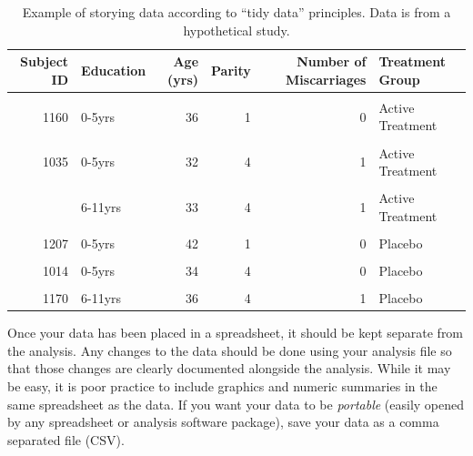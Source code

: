 \documentclass[
  letterpaper,
  DIV=11,
  numbers=noendperiod]{scrreprt}
\theoremstyle{definition}
\theoremstyle{definition}
\theoremstyle{remark}
\begin{document}
\hypertarget{tbl-statistical-process-tidy-data}{}
\begin{table}
\caption{\label{tbl-statistical-process-tidy-data}Example of storying data according to ``tidy data'' principles. Data is
from a hypothetical study. }\tabularnewline

\centering
\begin{tabular}[t]{rlrrrl}
\toprule
Subject ID & Education & Age (yrs) & Parity & Number of Miscarriages & Treatment Group\\
\midrule
\cellcolor{gray!6}{1089} & \cellcolor{gray!6}{0-5yrs} & \cellcolor{gray!6}{28} & \cellcolor{gray!6}{6} & \cellcolor{gray!6}{0} & \cellcolor{gray!6}{Active Treatment}\\
1160 & 0-5yrs & 36 & 1 & 0 & Active Treatment\\
\cellcolor{gray!6}{1025} & \cellcolor{gray!6}{0-5yrs} & \cellcolor{gray!6}{34} & \cellcolor{gray!6}{6} & \cellcolor{gray!6}{0} & \cellcolor{gray!6}{Active Treatment}\\
1035 & 0-5yrs & 32 & 4 & 1 & Active Treatment\\
\cellcolor{gray!6}{1112} & \cellcolor{gray!6}{6-11yrs} & \cellcolor{gray!6}{32} & \cellcolor{gray!6}{3} & \cellcolor{gray!6}{0} & \cellcolor{gray!6}{Active Treatment}\\
\addlinespace
1030 & 6-11yrs & 33 & 4 & 1 & Active Treatment\\
\cellcolor{gray!6}{1159} & \cellcolor{gray!6}{0-5yrs} & \cellcolor{gray!6}{26} & \cellcolor{gray!6}{6} & \cellcolor{gray!6}{2} & \cellcolor{gray!6}{Placebo}\\
1207 & 0-5yrs & 42 & 1 & 0 & Placebo\\
\cellcolor{gray!6}{1179} & \cellcolor{gray!6}{0-5yrs} & \cellcolor{gray!6}{39} & \cellcolor{gray!6}{6} & \cellcolor{gray!6}{0} & \cellcolor{gray!6}{Placebo}\\
1014 & 0-5yrs & 34 & 4 & 0 & Placebo\\
\addlinespace
\cellcolor{gray!6}{1195} & \cellcolor{gray!6}{6-11yrs} & \cellcolor{gray!6}{35} & \cellcolor{gray!6}{3} & \cellcolor{gray!6}{1} & \cellcolor{gray!6}{Placebo}\\
1170 & 6-11yrs & 36 & 4 & 1 & Placebo\\
\bottomrule
\end{tabular}
\end{table}

Once your data has been placed in a spreadsheet, it should be kept
separate from the analysis. Any changes to the data should be done using
your analysis file so that those changes are clearly documented
alongside the analysis. While it may be easy, it is poor practice to
include graphics and numeric summaries in the same spreadsheet as the
data. If you want your data to be \emph{portable} (easily opened by any
spreadsheet or analysis software package), save your data as a comma
separated file (CSV).
\end{document}
